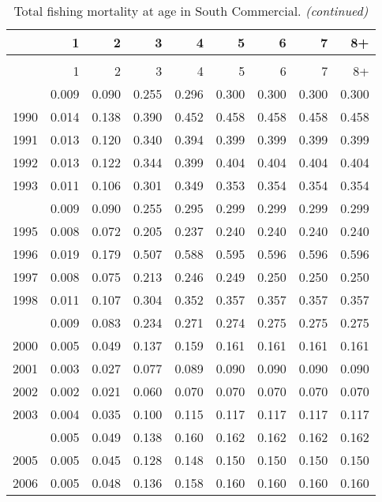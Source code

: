 \documentclass[
]{article}
\begin{document}
\begin{longtable}[t]{lrrrrrrrr}
\caption{\label{tab:South_Commercial-fleet-FAA-table}Total fishing mortality at age in South Commercial.}\\
\toprule
  & 1 & 2 & 3 & 4 & 5 & 6 & 7 & 8+\\
\midrule
\endfirsthead
\caption[]{Total fishing mortality at age in South Commercial. \textit{(continued)}}\\
\toprule
  & 1 & 2 & 3 & 4 & 5 & 6 & 7 & 8+\\
\midrule
\endhead

\endfoot
\bottomrule
\endlastfoot
1989 & 0.009 & 0.090 & 0.255 & 0.296 & 0.300 & 0.300 & 0.300 & 0.300\\
1990 & 0.014 & 0.138 & 0.390 & 0.452 & 0.458 & 0.458 & 0.458 & 0.458\\
1991 & 0.013 & 0.120 & 0.340 & 0.394 & 0.399 & 0.399 & 0.399 & 0.399\\
1992 & 0.013 & 0.122 & 0.344 & 0.399 & 0.404 & 0.404 & 0.404 & 0.404\\
1993 & 0.011 & 0.106 & 0.301 & 0.349 & 0.353 & 0.354 & 0.354 & 0.354\\
\addlinespace
1994 & 0.009 & 0.090 & 0.255 & 0.295 & 0.299 & 0.299 & 0.299 & 0.299\\
1995 & 0.008 & 0.072 & 0.205 & 0.237 & 0.240 & 0.240 & 0.240 & 0.240\\
1996 & 0.019 & 0.179 & 0.507 & 0.588 & 0.595 & 0.596 & 0.596 & 0.596\\
1997 & 0.008 & 0.075 & 0.213 & 0.246 & 0.249 & 0.250 & 0.250 & 0.250\\
1998 & 0.011 & 0.107 & 0.304 & 0.352 & 0.357 & 0.357 & 0.357 & 0.357\\
\addlinespace
1999 & 0.009 & 0.083 & 0.234 & 0.271 & 0.274 & 0.275 & 0.275 & 0.275\\
2000 & 0.005 & 0.049 & 0.137 & 0.159 & 0.161 & 0.161 & 0.161 & 0.161\\
2001 & 0.003 & 0.027 & 0.077 & 0.089 & 0.090 & 0.090 & 0.090 & 0.090\\
2002 & 0.002 & 0.021 & 0.060 & 0.070 & 0.070 & 0.070 & 0.070 & 0.070\\
2003 & 0.004 & 0.035 & 0.100 & 0.115 & 0.117 & 0.117 & 0.117 & 0.117\\
\addlinespace
2004 & 0.005 & 0.049 & 0.138 & 0.160 & 0.162 & 0.162 & 0.162 & 0.162\\
2005 & 0.005 & 0.045 & 0.128 & 0.148 & 0.150 & 0.150 & 0.150 & 0.150\\
2006 & 0.005 & 0.048 & 0.136 & 0.158 & 0.160 & 0.160 & 0.160 & 0.160\\

\end{longtable}
\end{document}
